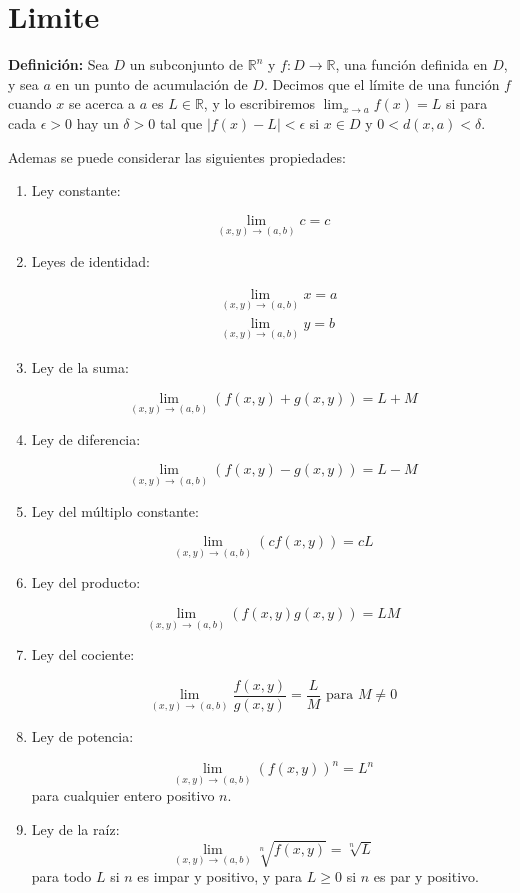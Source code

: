 \section{Limite}
\textbf{Definición:} Sea $D$ un subconjunto de $\mathbb{R}^{n}$ y $f: D \rightarrow \mathbb{R}$, una función definida en $D$, y sea $a$ en un punto de acumulación de $D$. Decimos que el límite de una función $f$ cuando $x$ se acerca a $a$ es $L \in \mathbb{R}$, y lo escribiremos $\lim _{x \rightarrow a} f(x)=L$ si para cada $\epsilon>0$ hay un $\delta>0$ tal que $|f(x)-L|<\epsilon$ si $x \in D$ y $0<d(x, a)<\delta$.\par
Ademas se puede considerar las siguientes propiedades:\par
\begin{enumerate}
    \item Ley constante:\par
          $$
              \lim _{(x, y) \rightarrow(a, b)} c=c
          $$
    \item Leyes de identidad:\par
          $$
              \begin{aligned}
                   & \lim _{(x, y) \rightarrow(a, b)} x=a \\
                   & \lim _{(x, y) \rightarrow(a, b)} y=b
              \end{aligned}
          $$
    \item Ley de la suma:\par
          $$
              \lim _{(x, y) \rightarrow(a, b)}(f(x, y)+g(x, y))=L+M
          $$
    \item Ley de diferencia:\par
          $$
              \lim _{(x, y) \rightarrow(a, b)}(f(x, y)-g(x, y))=L-M
          $$
    \item Ley del múltiplo constante:\par
          $$
              \lim _{(x, y) \rightarrow(a, b)}(c f(x, y))=c L
          $$
    \item Ley del producto:\par
          $$
              \lim _{(x, y) \rightarrow(a, b)}(f(x, y) g(x, y))=L M
          $$
    \item Ley del cociente:\par
          $$
              \lim _{(x, y) \rightarrow(a, b)} \frac{f(x, y)}{g(x, y)}=\frac{L}{M} \text { para } M \neq 0
          $$
    \item Ley de potencia:\par
          $$
              \lim _{(x, y) \rightarrow(a, b)}(f(x, y))^{n}=L^{n}
          $$
          para cualquier entero positivo $n$.\par
    \item Ley de la raíz:
          $$
              \lim _{(x, y) \rightarrow(a, b)} \sqrt[n]{f(x, y)}=\sqrt[n]{L}
          $$
          para todo $L$ si $n$ es impar y positivo, y para $L \geq 0$ si $n$ es par y positivo.\par
\end{enumerate}

